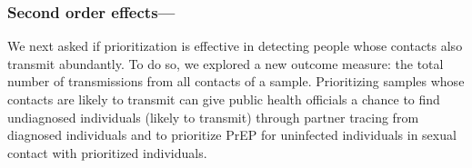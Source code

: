 \documentclass[oupdraft]{sysbio}
\newcommand{\PLWH}{sample\xspace}
\begin{document}
\subsubsection{Second order effects---}
We next asked if prioritization is effective in detecting people whose contacts also transmit abundantly. 
To do so, we explored a new outcome measure: the total number of transmissions from all contacts of a \PLWH. 
Prioritizing \PLWH{s} whose contacts are likely to transmit can give public health officials a chance to find undiagnosed individuals (likely to transmit) through partner tracing from diagnosed individuals and to  prioritize PrEP for uninfected individuals in sexual contact with prioritized individuals. 




\end{document}
